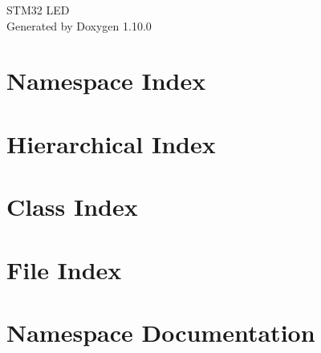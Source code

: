 \documentclass[twoside]{book}
\newcommand{\+}{\discretionary{\mbox{\scriptsize$\hookleftarrow$}}{}{}}
\newcommand{\clearemptydoublepage}{%
    \newpage{\pagestyle{empty}\cleardoublepage}%
  }
\begin{document}
  \raggedbottom
    \hypersetup{pageanchor=false,
                bookmarksnumbered=true,
                pdfencoding=unicode
               }
  \begin{titlepage}
  \vspace*{7cm}
  \begin{center}%
  {\Large STM32 LED}\\
  \vspace*{1cm}
  {\large Generated by Doxygen 1.10.0}\\
  \end{center}
  \end{titlepage}
  \clearemptydoublepage
  \tableofcontents
  \clearemptydoublepage
  \hypersetup{pageanchor=true}
\chapter{Namespace Index}

\chapter{Hierarchical Index}

\chapter{Class Index}

\chapter{File Index}

\chapter{Namespace Documentation}




\end{document}
